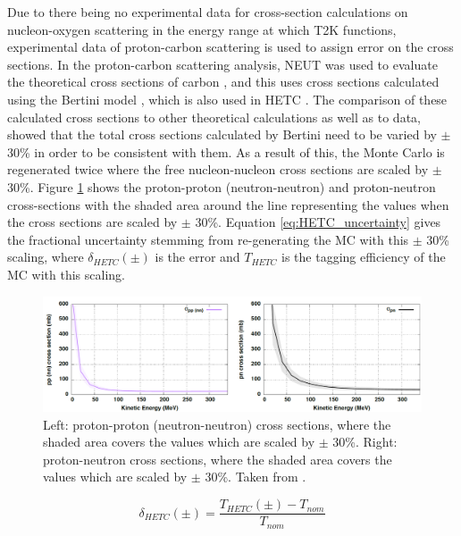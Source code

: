 Due to there being no experimental data for cross-section calculations on nucleon-oxygen scattering in the energy range at which T2K functions, experimental data of proton-carbon scattering is used to assign error on the cross sections. In the proton-carbon scattering analysis, NEUT was used to evaluate the theoretical cross sections of carbon \cite{hayato_neut}, and this uses cross sections calculated using the Bertini model \cite{bertini_hetc}, which is also used in HETC \cite{hetc_paper}. The comparison of these calculated cross sections to other theoretical calculations as well as to data, showed that the total cross sections calculated by Bertini need to be varied by $\pm$ 30\% in order to be consistent with them. As a result of this, the Monte Carlo is regenerated twice where the free nucleon-nucleon cross sections are scaled by $\pm$ 30\%. Figure \ref{fig:pp_nn_xsec} shows the proton-proton (neutron-neutron) and proton-neutron cross-sections with the shaded area around the line representing the values when the cross sections are scaled by $\pm$ 30\%. Equation \ref{eq:HETC_uncertainty} gives the fractional uncertainty stemming from re-generating the MC with this $\pm$ 30\% scaling, where $\delta_{HETC}(\pm)$ is the error and $T_{HETC}$ is the tagging efficiency of the MC with this scaling.


\begin{figure}[!htb]
\centering
    \includegraphics[width=\textwidth]{Figures/pp_nn_xsec.PNG}
\caption{Left: proton-proton (neutron-neutron) cross sections, where the shaded area covers the values which are scaled by $\pm$ 30\%. Right: proton-neutron cross sections, where the shaded area covers the values which are scaled by $\pm$ 30\%. Taken from \cite{tn415_fiacob}.}
\label{fig:pp_nn_xsec}
\end{figure}



\begin{equation}
    \delta_{HETC }(\pm)=\frac{T_{HETC}(\pm)-T_{nom }}{T_{nom }}
\label{eq:HETC_uncertainty}
\end{equation}

